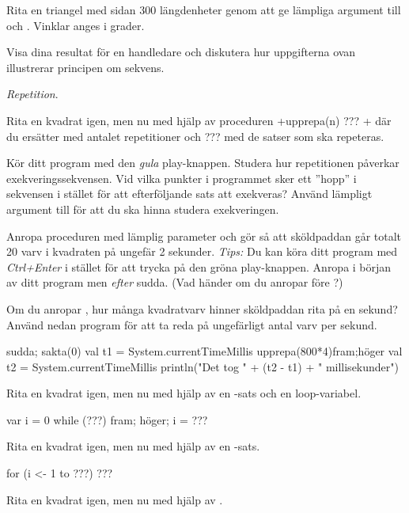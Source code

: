 \Subtask Rita en triangel med sidan 300 längdenheter genom att ge lämpliga argument till  och . Vinklar anges i grader.

\Subtask\Checkpoint Visa dina resultat för en handledare och diskutera hur uppgifterna ovan illustrerar principen om sekvens.

\Task \textit{Repetition}. 

\Subtask Rita en kvadrat igen, men nu med hjälp av proceduren \code+upprepa(n){ ??? }+ där du ersätter  med antalet repetitioner och ??? med de satser som ska repeteras.

\Subtask Kör ditt program med den \emph{gula} play-knappen. Studera hur repetitionen påverkar  exekveringssekvensen. Vid vilka punkter i programmet sker ett ''hopp'' i sekvensen i stället för att efterföljande sats att exekveras? Använd lämpligt argument till  för att du ska hinna studera exekveringen.

\Subtask Anropa proceduren  med lämplig parameter och gör så att sköldpaddan går totalt 20 varv i kvadraten på ungefär 2 sekunder. \emph{Tips:} Du kan köra ditt program med \emph{Ctrl+Enter} i stället för att trycka på den gröna play-knappen. Anropa  i början av ditt program men \emph{efter} sudda. (Vad händer om du anropar  före ?)


\Subtask Om du anropar , hur många kvadratvarv hinner sköldpaddan rita på en sekund? Använd nedan program för att ta reda på ungefärligt antal varv per sekund.
\begin{Code}
sudda; sakta(0)
val t1 = System.currentTimeMillis
upprepa(800*4){fram;höger}
val t2 = System.currentTimeMillis
println("Det tog " + (t2 - t1) + " millisekunder")
\end{Code} 



\Subtask Rita en kvadrat igen, men nu med hjälp av en -sats och en loop-variabel.

\begin{Code}
var i = 0
while (???) {fram; höger; i = ???}
\end{Code} 

\Subtask Rita en kvadrat igen, men nu med hjälp av en -sats.

\begin{Code}
for (i <- 1 to ???) {???}
\end{Code} 

\Subtask Rita en kvadrat igen, men nu med hjälp av .

